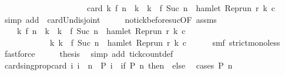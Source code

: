 \begin{isabellebody}
\ \ \ \ \ \ \ \ \ \ \ \ \ \ \ \ \ \ \ \ {\isacharplus}\ card\ {\isacharbraceleft}k{\isachardot}\ f\ n\ {\isacharless}\ k\ {\isasymand}\ k\ {\isasymle}\ f\ {\isacharparenleft}Suc\ n{\isacharparenright}\ {\isasymand}\ hamlet\ {\isacharparenleft}Rep{\isacharunderscore}run\ r\ k\ c{\isacharparenright}{\isacharbraceright}{\isacartoucheclose}\isanewline
\ \ \ \ \isamarkupfalse%
\ {\isacharparenleft}simp\ add{\isacharcolon}\ {\isacharasterisk}\ card{\isacharunderscore}Un{\isacharunderscore}disjoint{\isacharparenright}\isanewline
\ \ \isamarkupfalse%
\ \isamarkupfalse%
\ no{\isacharunderscore}tick{\isacharunderscore}before{\isacharunderscore}suc{\isacharbrackleft}OF\ assms{\isacharbrackright}\ \isamarkupfalse%
\isanewline
\ \ \ \ {\isacartoucheopen}{\isacharbraceleft}k{\isachardot}\ f\ n\ {\isacharless}\ k\ {\isasymand}\ k\ {\isasymle}\ f\ {\isacharparenleft}Suc\ n{\isacharparenright}\ {\isasymand}\ hamlet\ {\isacharparenleft}{\isacharparenleft}Rep{\isacharunderscore}run\ r{\isacharparenright}\ k\ c{\isacharparenright}{\isacharbraceright}\ {\isacharequal}\isanewline
\ \ \ \ \ \ \ \ \ \ \ \ {\isacharbraceleft}k{\isachardot}\ k\ {\isacharequal}\ f\ {\isacharparenleft}Suc\ n{\isacharparenright}\ {\isasymand}\ hamlet\ {\isacharparenleft}{\isacharparenleft}Rep{\isacharunderscore}run\ r{\isacharparenright}\ k\ c{\isacharparenright}{\isacharbraceright}{\isacartoucheclose}\isanewline
\ \ \ \ \isamarkupfalse%
\ smf\ strict{\isacharunderscore}mono{\isacharunderscore}less\ \isamarkupfalse%
\ fastforce\isanewline
\ \ \isamarkupfalse%
\ \isamarkupfalse%
\ {\isacharquery}thesis\ \isamarkupfalse%
\ {\isacharparenleft}simp\ add{\isacharcolon}\ tick{\isacharunderscore}count{\isacharunderscore}def{\isacharparenright}\isanewline
{}\isamarkupfalse%
%
\endisatagproof
{\isafoldproof}%
%
\isadelimproof
\isanewline
%
\endisadelimproof
\isanewline
{}\isamarkupfalse%
\ card{\isacharunderscore}sing{\isacharunderscore}prop{\isacharcolon}{\isacartoucheopen}card\ {\isacharbraceleft}i{\isachardot}\ i\ {\isacharequal}\ n\ {\isasymand}\ P\ i{\isacharbraceright}\ {\isacharequal}\ {\isacharparenleft}if\ P\ n\ then\ {}\ else\ {}{\isacharparenright}{\isacartoucheclose}\isanewline
%
\isadelimproof
%
\endisadelimproof
%
\isatagproof
{}\isamarkupfalse%
\ {\isacharparenleft}cases\ {\isacartoucheopen}P\ n{\isacartoucheclose}{\isacharparenright}\isanewline
\ \ \isamarkupfalse%

\end{isabellebody}
